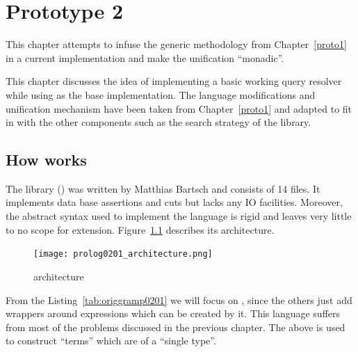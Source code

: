 \documentclass[thesis-solanki.tex]{subfiles}
\begin{document}
\chapter{Prototype 2}{\label{proto2}}

This chapter attempts to infuse the generic methodology from Chapter~\ref{proto1} in a current 
implementation \cite{prolog-lib} and make the unification ``monadic''.

This chapter discusses the idea of implementing a basic working  query resolver while using
 \cite{prolog-lib} as the base implementation.
The language modifications and unification mechanism have been taken from Chapter~\ref{proto1} and adapted to fit
in with the other components such as the search strategy of the library.


\section{How \protect{} works}

The  library (\cite{prolog-lib}) was written by Matthias Bartsch and consists of 14
 files.
It implements data base assertions and cuts but lacks any IO facilities.
Moreover, the abstract syntax used to implement the language is rigid and leaves very little to no scope for
extension.
Figure~\ref{fig:prlg0201architecture} describes its architecture.

\begin{figure}[H]
\centering
\texttt{[image: prolog0201\_architecture.png]}
\caption{ \cite{prolog-lib} architecture}
\label{fig:prlg0201architecture}
\end{figure}

From the Listing~\ref{tab:origgramp0201} we will focus on , since the others just
add wrappers around expressions which can be created by it.
This language suffers from most of the problems discussed in the previous chapter.
The above is used to construct  ``terms'' which are of a ``single type''.
\end{document}

